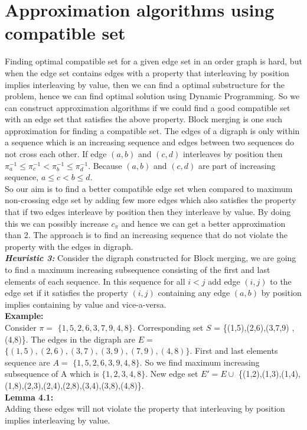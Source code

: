 \documentclass[BTech]{iitmdiss}
\begin{document}
\section{Approximation algorithms using compatible set}
Finding optimal compatible set for a given edge set in an order graph is hard, but when the edge set contains edges with a property that interleaving by position implies interleaving by value, then we can find a optimal substructure for the problem, hence we can find optimal solution using Dynamic Programming. So we can construct approximation algorithms if we could find a good compatible set with an edge set that satisfies the above property. Block merging is one such approximation for finding a compatible set. The edges of a digraph is only within a sequence which is an increasing sequence and edges between two sequences do not cross each other. If edge $(a,b)$ and $(c,d)$ interleaves by position then $\pi^{-1}_a \leq \pi^{-1}_c < \pi^{-1}_b\leq \pi^{-1}_d$. Because $(a,b)$ and $(c,d)$ are part of increasing sequence, $a \leq c < b\leq d$.\\
 So our aim is to find a better compatible edge set when compared to maximum non-crossing edge set by adding few more edges which also satisfies the property that if two edges interleave by position then they interleave by value. By doing this we can possibly increase $c_\pi$ and hence we can get a better approximation than 2. The approach is to find an increasing sequence that do not violate the property with the edges in digraph.\\
\textit{\textbf{Heuristic 3:}} Consider the digraph constructed for Block merging, we are going to find a maximum increasing subsequence consisting of the first and last elements of each sequence. In this sequence for all $i<j$ add edge $(i,j)$ to the edge set if it satisfies the property $(i,j)$ containing any edge $(a,b)$ by position implies containing by value and vice-a-versa.\\
\textbf{Example:}\\
Consider $\pi = $ $\{1,5,2,6,3,7,9,4,8\}$. Corresponding set $S$ = \{(1,5),(2,6),(3,7,9) ,(4,8)\}. The edges in the digraph are $E =$ $\{(1,5),(2,6),(3,7),(3,9),(7,9),(4,8)\}$. First and last elements sequence are $A = $ $\{1,5,2,6,3,9,4,8\}$. So we find maximum increasing subsequence of A which is $\{1,2,3,4,8\}$. New edge set $E' = E \cup$ \{(1,2),(1,3),(1,4),(1,8),(2,3),(2,4),(2,8),(3,4),(3,8),(4,8)\}.\\
\textbf{Lemma 4.1:}\\ Adding these edges will not violate the property that interleaving by position implies interleaving by value.\\
\end{document}
